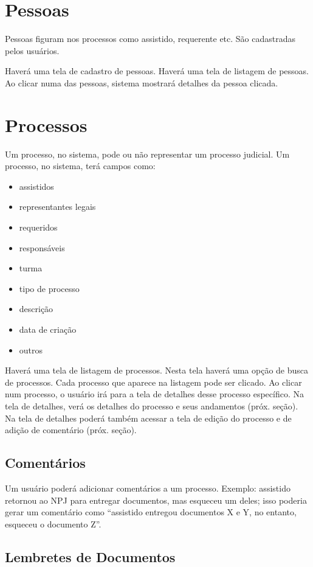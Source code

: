 \documentclass[a4paper]{article}
\begin{document}
\section{Pessoas}

Pessoas figuram nos processos como assistido, requerente etc. São
cadastradas pelos usuários.

Haverá uma tela de cadastro de pessoas.  Haverá uma tela de listagem
de pessoas. Ao clicar numa das pessoas, sistema mostrará detalhes da
pessoa clicada.

\section{Processos}

Um processo, no sistema, pode ou não representar um processo
judicial. Um processo, no sistema, terá campos como:

\begin{itemize}
\item assistidos
\item representantes legais
\item requeridos
\item responsáveis
\item turma
\item tipo de processo
\item descrição
\item data de criação
\item outros
\end{itemize}

Haverá uma tela de listagem de processos. Nesta tela haverá uma opção
de busca de processos. Cada processo que aparece na listagem pode ser
clicado. Ao clicar num processo, o usuário irá para a tela de detalhes
desse processo específico. Na tela de detalhes, verá os detalhes do
processo e seus andamentos (próx. seção). Na tela de detalhes poderá
também acessar a tela de edição do processo e de adição de comentário
(próx. seção).

\subsection{Comentários}

Um usuário poderá adicionar comentários a um processo. Exemplo:
assistido retornou ao NPJ para entregar documentos, mas esqueceu um
deles; isso poderia gerar um comentário como ``assistido entregou
documentos X e Y, no entanto, esqueceu o documento Z''.

\subsection{Lembretes de Documentos}
\end{document}
